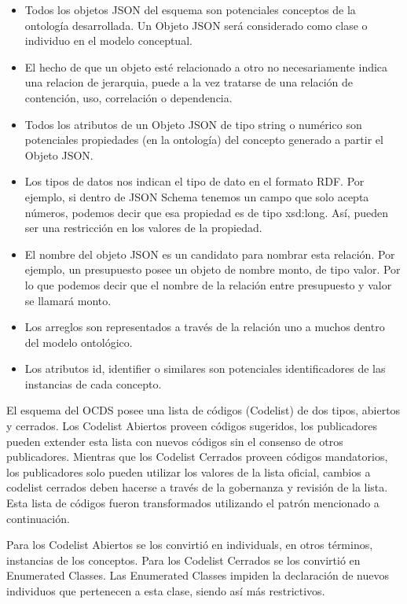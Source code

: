 \begin{itemize}
    \item Todos los objetos JSON del esquema son potenciales conceptos de la ontología desarrollada. Un Objeto JSON será considerado como clase o individuo en el modelo conceptual.
    \item El hecho de que un objeto esté relacionado a otro no necesariamente indica una relacion de jerarquia, puede a la vez tratarse de una relación de contención, uso, correlación o dependencia.
    \item Todos los atributos de un Objeto JSON de tipo string o numérico son potenciales propiedades (en la ontología) del concepto generado a partir el Objeto JSON.
    \item Los tipos de datos nos indican el tipo de dato en el formato RDF. Por ejemplo, si dentro de JSON Schema tenemos un campo que solo acepta números, podemos decir que esa propiedad es de tipo xsd:long. Así, pueden ser una restricción en los valores de la propiedad.
    \item El nombre del objeto JSON es un candidato para nombrar esta relación. Por ejemplo, un presupuesto posee un objeto de nombre monto, de tipo valor. Por lo que podemos decir que el nombre de la relación entre presupuesto y valor se llamará monto.
    \item Los arreglos son representados a través de la relación uno a muchos dentro del modelo ontológico.
    \item Los atributos id, identifier o similares son potenciales identificadores de las instancias de cada concepto.
    
\end{itemize}

El esquema del OCDS posee una lista de códigos (Codelist) de dos tipos, abiertos y cerrados. Los Codelist Abiertos proveen códigos sugeridos, los publicadores pueden extender esta lista con nuevos códigos sin el consenso de otros publicadores. Mientras que los Codelist Cerrados proveen códigos mandatorios, los publicadores solo pueden utilizar los valores de la lista oficial, cambios a codelist cerrados deben hacerse a través de la gobernanza y revisión de la lista. Esta lista de códigos fueron transformados utilizando el patrón mencionado a continuación. 

Para los Codelist Abiertos se los convirtió en individuals, en otros términos, instancias de los conceptos. Para los Codelist Cerrados  se los convirtió en Enumerated Classes. Las Enumerated Classes impiden la declaración de nuevos individuos que pertenecen a esta clase, siendo así más restrictivos.
